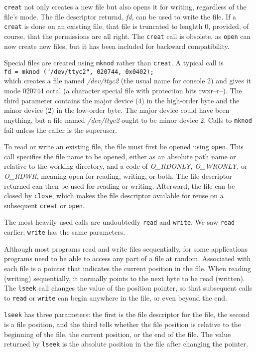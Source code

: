 \documentclass{book}
\newcommand {\sys} [1] {\textsl{#1}}
\newcommand {\cmd} [1] {\texttt{#1}}
\begin{document}
\cmd{creat} not only creates a new file but also opens it for writing, regardless of the file's mode.
The file descriptor returnd, \sys{fd}, can be used to write the file.
If a \cmd{creat} is done on an existing file, that file is truncated to lenghth 0, provided, of course, that the permissions are all right.
The \cmd{creat} call is obsolete, as \cmd{open} can now create new files, but it has been included for backward compatibility.

Special files are created using \cmd{mknod} rather than \cmd{creat}.
A typical call is\\
\cmd{fd = mknod ("/dev/ttyc2", 020744, 0x0402);}\\
which creates a file named \sys{/dev/ttyc2} (the usual name for console 2) 
and gives it mode 020744 octal (a character special file with protection bits rwxr--r--).
The third parameter contains the major device (4) in the high-order byte and the minor device (2) in the low-order byte.
The major device could have been anything, but a file named \sys{/dev/ttyc2} ought to be minor device 2.
Calls to \cmd{mknod} fail unless the caller is the superuser.

To read or write an existing file, the file must first be opened using \cmd{open}.
This call specifies the file name to be opened, either as an absolute path name or relative to the working directory, 
and a code of \sys{O\_RDONLY}, \sys{O\_WRONLY}, or \sys{O\_RDWR}, meaning open for reading, writing, or both.
The file descriptor returned can then be used for reading or writing.
Afterward, the file can be closed by \cmd{close}, which makes the file descriptor available for reuse on a subsequent \cmd{creat} or \cmd{open}.

The most heavily used calls are undoubtedly \cmd{read} and \cmd{write}.
We saw \cmd{read} earlier; \cmd{write} has the same parameters.

Although most programs read and write files sequentially, 
for some applications programs need to be able to access any part of a file at random.
Associated with each file is a pointer that indicates the current position in the file.
When reading (writing) sequentially, it normally points to the next byte to be read (written).
The \cmd{lseek} call changes the value of the position pointer, 
so that subsequent calls to \cmd{read} or \cmd{write} can begin anywhere in the file, or even beyond the end.

\cmd{lseek} has three parameters: the first is the file descriptor for the file, the second is a file position, 
and the third tells whether the file position is relative to the beginning of the file, the current position, or the end of the file.
The value returned by \cmd{lseek} is the absolute position in the file after changing the pointer.
\end{document}
